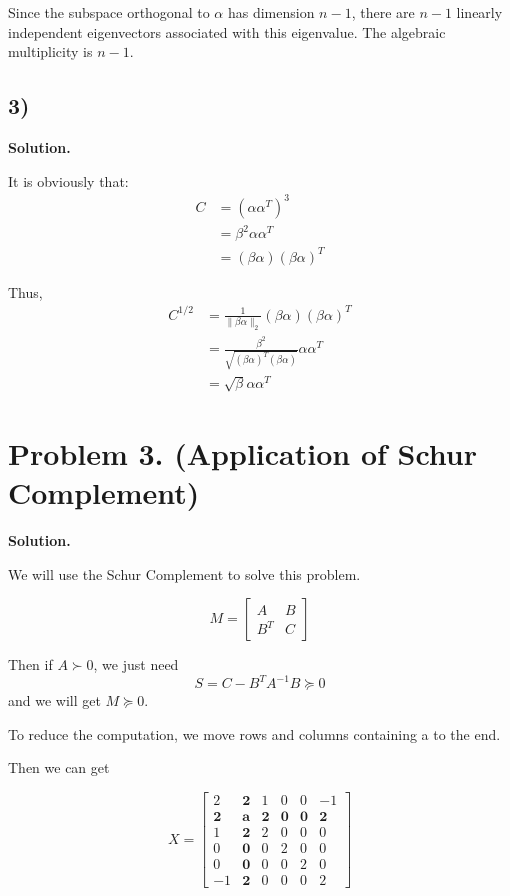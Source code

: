 \documentclass{article}
\newcommand{\0}{{\mathbf{0}}} %
\begin{document}
Since the subspace orthogonal to $\alpha$ has dimension $n-1$,
there are $n-1$ linearly independent eigenvectors associated with this eigenvalue.
The algebraic multiplicity is $n-1$.

\subsection*{3)}

\textbf{Solution.}

It is obviously that:
\begin{align*}
C &= (\alpha \alpha^T)^3    \\
&= \beta^2 \alpha \alpha^T  \\
&= (\beta \alpha)(\beta \alpha)^T
\end{align*}

Thus,
\begin{align*}
C^{1/2} &= \frac{1}{\|\beta \alpha\|_2}(\beta \alpha)(\beta \alpha)^T   \\
&= \frac{\beta^2}{\sqrt{(\beta \alpha)^T (\beta \alpha)}} \alpha \alpha^T   \\
&= \sqrt{\beta}\alpha \alpha^T
\end{align*}

\section*{Problem 3. (Application of Schur Complement)}

\textbf{Solution.}

We will use the Schur Complement to solve this problem.

$$
M =
\begin{bmatrix} A & B \\ B^T & C
\end{bmatrix}
$$

Then if $ A \succ 0 $, we just need
$$S = C - B^T A^{-1} B \succeq 0$$
and we will get $M \succeq 0$.

To reduce the computation, we move rows and columns containing a to the end.

Then we can get

$$X =
\begin{bmatrix}
2 & \mathbf{2} & 1 & 0 & 0 & -1 \\
\mathbf{2} & \mathbf{a} & \mathbf{2} & \mathbf{0} & \mathbf{0} & \mathbf{2} \\
1 & \mathbf{2} & 2 & 0 & 0 & 0 \\
0 & \mathbf{0} & 0 & 2 & 0 & 0 \\
0 & \mathbf{0} & 0 & 0 & 2 & 0 \\
-1 & \mathbf{2} & 0 & 0 & 0 & 2
\end{bmatrix}$$
\end{document}
